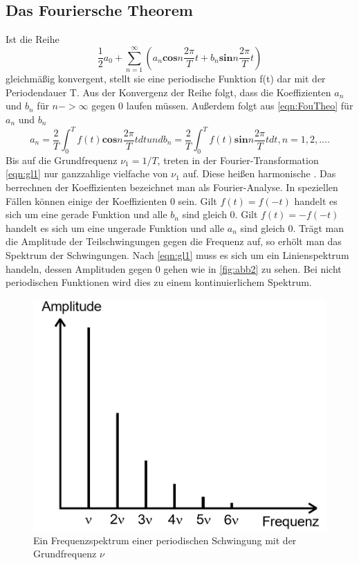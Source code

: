 \subsection{Das Fouriersche Theorem}
\label{sec:Fouriersche Theorem}
Ist die Reihe
\begin{equation}
  \frac{1}{2} a_0 + \sum_{n = 1}^{\infty} \left( a_n \symbf{cos} n \frac{2 \pi}{T} t + b_n \symbf{sin} n \frac{2 \pi}{T} t \right) 
  \label{eqn:gl1}
\end{equation}
gleichmäßig konvergent, stellt sie eine periodische Funktion f(t) dar mit der Periodendauer T.
Aus der Konvergenz der Reihe folgt, dass die Koeffizienten $a_n$ und $b_n$ für $n -> \infty$ gegen 0 laufen müssen.
Außerdem folgt aus \ref{eqn:FouTheo} für $a_n$ und $b_n$
\begin{equation}
  a_n = \frac{2}{T} \int_0^T f(t) \symbf{cos} n \frac{2 \pi}{T} t dt   
  und   
  b_n = \frac{2}{T} \int_0^T f(t) \symbf{sin} n \frac{2 \pi}{T} t dt       
  ,n= 1, 2, .... 
  \label{eqn:gl2}
\end{equation}
Bis auf die Grundfrequenz $\nu_1 = 1/T$, treten in der Fourier-Transformation \ref{eqn:gl1} nur ganzzahlige vielfache von $\nu_1$ auf.
Diese heißen harmonische .
Das berrechnen der Koeffizienten bezeichnet man als Fourier-Analyse.
In speziellen Fällen können einige der Koeffizienten 0 sein. 
Gilt $f(t) = f(-t)$ handelt es sich um eine gerade Funktion und alle $b_n$ sind gleich 0.
Gilt $f(t) = -f(-t)$ handelt es sich um eine ungerade Funktion und alle $a_n$ sind gleich 0.
Trägt man die Amplitude der Teilschwingungen gegen die Frequenz auf, so erhölt man das Spektrum der Schwingungen.
Nach \ref{eqn:gl1} muss es sich um ein Linienspektrum handeln, dessen Amplituden gegen 0 gehen wie in \ref{fig:abb2} zu sehen.
Bei nicht periodischen Funktionen wird dies zu einem kontinuierlichem Spektrum.
\begin{figure}
  \centering
  \includegraphics[width=\textwidth]{abb1.jpg}
  \caption{Ein Frequenzspektrum einer periodischen Schwingung mit der Grundfrequenz $\nu$}
  \label{fig:abb1}
\end{figure}

